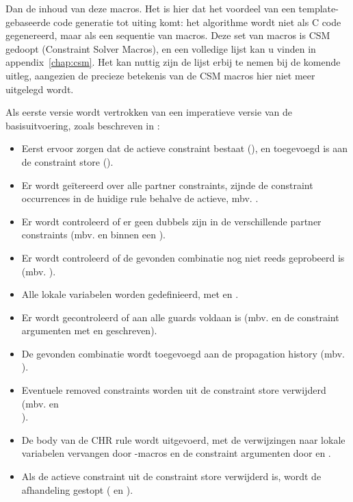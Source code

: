 Dan de inhoud van deze macros. Het is hier dat het voordeel van een template-gebaseerde code generatie tot uiting komt: het algorithme wordt niet als C code gegenereerd, maar als een sequentie van macros. Deze set van macros is CSM gedoopt (Constraint Solver Macros), en een volledige lijst kan u vinden in appendix~\ref{chap:csm}. Het kan nuttig zijn de lijst erbij te nemen bij de komende uitleg, aangezien de precieze betekenis van de CSM macros hier niet meer uitgelegd wordt.

Als eerste versie wordt vertrokken van een imperatieve versie van de basisuitvoering, zoals beschreven in \cite{tomsphdthesis}:
\begin{itemize}
  \item Eerst ervoor zorgen dat de actieve constraint bestaat (), en toegevoegd is aan de constraint store ().
  \item Er wordt ge\"itereerd over alle partner constraints, zijnde de constraint occurrences in de huidige rule behalve de actieve, mbv. .
  \item Er wordt controleerd of er geen dubbels zijn in de verschillende partner constraints (mbv.   en  binnen een ).
  \item Er wordt controleerd of de gevonden combinatie nog niet reeds geprobeerd is (mbv. ).
  \item Alle lokale variabelen worden gedefinieerd, met  en .
  \item Er wordt gecontroleerd of aan alle guards voldaan is (mbv.  en de constraint argumenten met  en  geschreven).
  \item De gevonden combinatie wordt toegevoegd aan de propagation history (mbv. ).
  \item Eventuele removed constraints worden uit de constraint store verwijderd (mbv.  en \\ ).
  \item De body van de CHR rule wordt uitgevoerd, met de verwijzingen naar lokale variabelen vervangen door -macros en de constraint argumenten door  en .
  \item Als de actieve constraint uit de constraint store verwijderd is, wordt de afhandeling gestopt ( en ).
\end{itemize}

